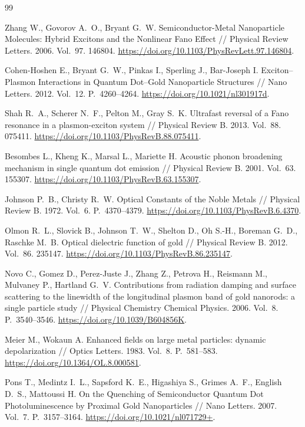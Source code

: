 \renewcommand{\refname}{Список литературы}
\begin{thebibliography}{99}

Zhang W., Govorov A.~O., Bryant G.~W.
Semiconductor-Metal Nanoparticle Molecules: Hybrid Excitons and the
Nonlinear Fano Effect // Physical Review Letters. 2006. Vol.~97. 146804.
\url{https://doi.org/10.1103/PhysRevLett.97.146804}.

Cohen-Hoshen E., Bryant G.~W., Pinkas I., Sperling J., Bar-Joseph I.
Exciton--Plasmon Interactions in Quantum Dot--Gold Nanoparticle Structures
// Nano Letters. 2012. Vol.~12. P.~4260--4264.
\url{https://doi.org/10.1021/nl301917d}.

Shah R.~A., Scherer N.~F., Pelton M., Gray S.~K.
Ultrafast reversal of a Fano resonance in a plasmon-exciton system
// Physical Review B. 2013. Vol.~88. 075411.
\url{https://doi.org/10.1103/PhysRevB.88.075411}.

Besombes L., Kheng K., Marsal L., Mariette H.
Acoustic phonon broadening mechanism in single quantum dot emission
// Physical Review B. 2001. Vol.~63. 155307.
\url{https://doi.org/10.1103/PhysRevB.63.155307}.

Johnson P.~B., Christy R.~W.
Optical Constants of the Noble Metals
// Physical Review B. 1972. Vol.~6. P.~4370--4379.
\url{https://doi.org/10.1103/PhysRevB.6.4370}.

Olmon R.~L., Slovick B., Johnson T.~W., Shelton D., Oh S.-H.,
Boreman G.~D., Raschke M.~B.
Optical dielectric function of gold
// Physical Review B. 2012. Vol.~86. 235147.
\url{https://doi.org/10.1103/PhysRevB.86.235147}.

Novo C., Gomez D., Perez-Juste J., Zhang Z., Petrova H., Reismann M.,
Mulvaney P., Hartland G.~V.
Contributions from radiation damping and surface scattering to the linewidth
of the longitudinal plasmon band of gold nanorods: a single particle study
// Physical Chemistry Chemical Physics. 2006. Vol.~8. P.~3540--3546.
\url{https://doi.org/10.1039/B604856K}.

Meier M., Wokaun A.
Enhanced fields on large metal particles: dynamic depolarization
// Optics Letters. 1983. Vol.~8. P.~581--583.
\url{https://doi.org/10.1364/OL.8.000581}.

Pons T., Medintz I.~L., Sapsford K.~E., Higashiya S., Grimes A.~F.,
English D.~S., Mattoussi H.
On the Quenching of Semiconductor Quantum Dot Photoluminescence
by Proximal Gold Nanoparticles
// Nano Letters. 2007. Vol.~7. P.~3157--3164.
\url{https://doi.org/10.1021/nl071729+}.


\end{thebibliography}
